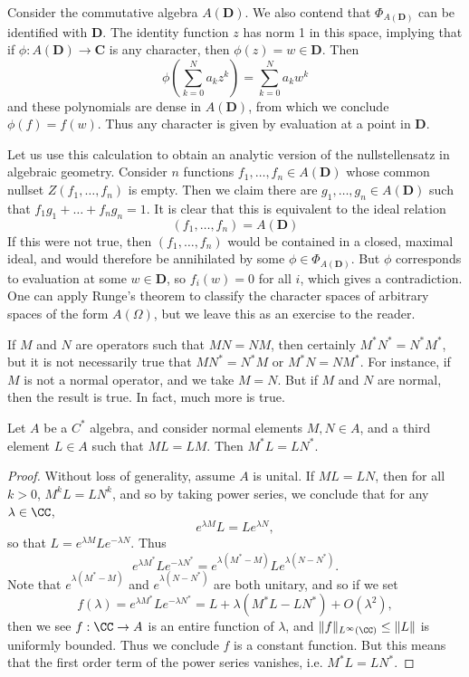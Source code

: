 \begin{example}
    Consider the commutative algebra $A(\mathbf{D})$. We also contend that $\Phi_{A(\mathbf{D})}$ can be identified with $\mathbf{D}$. The identity function $z$ has norm 1 in this space, implying that if $\phi: A(\mathbf{D}) \to \mathbf{C}$ is any character, then $\phi(z) = w \in \mathbf{D}$. Then
    \[ \phi(\sum_{k = 0}^N a_k z^k) = \sum_{k = 0}^N a_k w^k \]
    and these polynomials are dense in $A(\mathbf{D})$, from which we conclude $\phi(f) = f(w)$. Thus any character is given by evaluation at a point in $\mathbf{D}$.

    Let us use this calculation to obtain an analytic version of the nullstellensatz in algebraic geometry. Consider $n$ functions $f_1, \dots, f_n \in A(\mathbf{D})$ whose common nullset $Z(f_1,\dots,f_n)$ is empty. Then we claim there are $g_1,\dots,g_n \in A(\mathbf{D})$ such that $f_1 g_1 + \dots + f_n g_n = 1$. It is clear that this is equivalent to the ideal relation
    \[ (f_1, \dots, f_n) = A(\mathbf{D}) \]
    If this were not true, then $(f_1, \dots, f_n)$ would be contained in a closed, maximal ideal, and would therefore be annihilated by some $\phi \in \Phi_{A(\mathbf{D})}$. But $\phi$ corresponds to evaluation at some $w \in \mathbf{D}$, so $f_i(w) = 0$ for all $i$, which gives a contradiction. One can apply Runge's theorem to classify the character spaces of arbitrary spaces of the form $A(\Omega)$, but we leave this as an exercise to the reader.
\end{example}

If $M$ and $N$ are operators such that $MN = NM$, then certainly $M^*N^* = N^*M^*$, but it is not necessarily true that $MN^* = N^* M$ or $M^* N = N M^*$. For instance, if $M$ is not a normal operator, and we take $M = N$. But if $M$ and $N$ are normal, then the result is true. In fact, much more is true.

\begin{theorem}
    Let $A$ be a $C^*$ algebra, and consider normal elements $M,N \in A$, and a third element $L \in A$ such that $ML = LM$. Then $M^* L = L N^*$.
\end{theorem}
\begin{proof}
    Without loss of generality, assume $A$ is unital. If $ML = LN$, then for all $k > 0$, $M^kL = LN^k$, and so by taking power series, we conclude that for any $\lambda \in \CC$,
    \[ e^{\lambda M} L = L e^{\lambda N}, \]
    so that $L = e^{\lambda M} L e^{- \lambda N}$. Thus
    \[ e^{\lambda M^*} L e^{- \lambda N^*} = e^{\lambda (M^* - M)} L e^{\lambda (N - N^*)}. \]
    Note that $e^{\lambda(M^* - M)}$ and $e^{\lambda (N - N^*)}$ are both unitary, and so if we set
    \[ f(\lambda) = e^{\lambda M^*} L e^{- \lambda N^*} = L + \lambda (M^* L - L N^*) + O(\lambda^2), \]
    then we see $f: \CC \to A$ is an entire function of $\lambda$, and $\| f \|_{L^\infty(\CC)} \leq \| L \|$ is uniformly bounded. Thus we conclude $f$ is a constant function. But this means that the first order term of the power series vanishes, i.e. $M^* L = LN^*$.
\end{proof}

